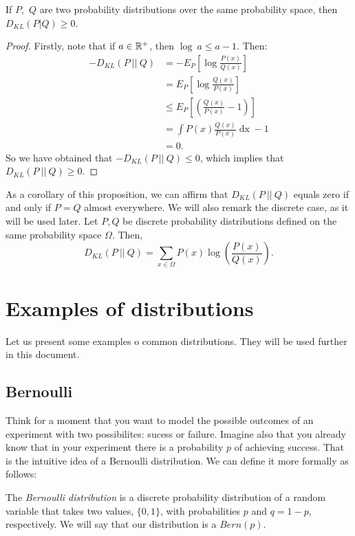 \begin{nprop}
If $P,$ $Q$ are two probability distributions over the same probability space, then $D_{KL}(P|Q) \geq 0$.
\end{nprop}
\begin{proof}
Firstly, note that if $a \in \mathbb{R}^+$, then $\log \ a \leq a-1$. Then:
\begin{align*}
-D_{KL}(P \ || \ Q) & = - E_P\left[\log{\frac{P(x)}{Q(x)}}\right] \\
             & = E_P\left[\log{\frac{Q(x)}{P(x)}}\right] \\
             & \leq E_P\left[\left(\frac{Q(x)}{P(x)} - 1\right)\right]\\
             & = \int P(x) \frac{Q(x)}{P(x)} \mathop{dx} -1 \\
             & = 0.
\end{align*}
So we have obtained that $-D_{KL}(P\ ||\ Q) \leq 0$, which implies that $D_{KL}(P\ || \ Q) \geq 0$.
\end{proof}
As a corollary of this proposition, we can affirm that $D_{KL}(P\ ||\ Q)$ equals zero if and only if $P = Q$ almost everywhere. 
We will also remark the discrete case, as it will be used later. Let $P,Q$ be discrete probability distributions defined on the same probability space $\Omega$. Then, 
$$
D_{KL}(P\ ||\ Q) = \sum_{x \in \Omega} P(x) \log \left( \frac{P(x)}{Q(x)}\right).
$$

\section{Examples of distributions}

Let us present some examples o common distributions. They will be used further in this document.

\subsection{Bernoulli}

Think for a moment that you want to model the possible outcomes of an experiment with two possibilites: sucess or failure. Imagine also that you already know that in your experiment there is a probability $p$ of 
achieving success. That is the intuitive idea of a Bernoulli distribution. We can define it more formally as follows: 

The \emph{Bernoulli distribution} is a discrete probability distribution of a random variable that takes two values, $\{0,1\}$, with probabilities $p$ and $q = 1-p$, respectively. We will say that our distribution is a $Bern(p)$.

